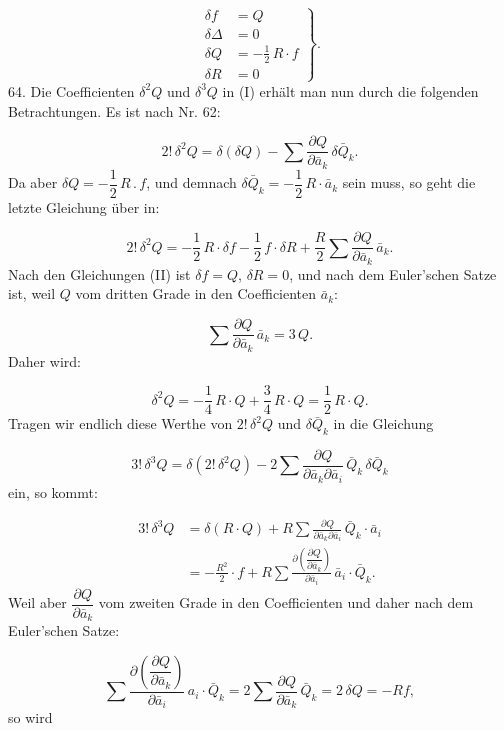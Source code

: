 \documentclass[11pt]{article}
\providecommand{\weberpage}[1]{}
\providecommand{\weq}[2]{\begin{equation}\tag{#1}#2\end{equation}}
\let\Delta\varDelta
\begin{document}
\weq{II}{
\left.\begin{aligned}
\delta f &= Q\\
\delta \Delta &= 0\\
\delta Q &= -\frac{1}{2}\,R\cdot f\\
\delta R &= 0
\end{aligned}\right\} .
}
64. Die Coefficienten $\delta^2 Q$ und $\delta^3 Q$ in (I) erhält man nun durch die folgenden Betrachtungen. Es ist nach Nr. 62:

\[
2!\,\delta^2 Q = \delta(\delta Q) - \sum \frac{\partial Q}{\partial \bar a_k}\,\delta \bar Q_k .
\]
Da aber $\delta Q = -\dfrac{1}{2}\,R\,.\,f$, und demnach $\delta \bar Q_k = -\dfrac{1}{2}\,R \cdot \bar a_k$ sein muss, so geht die letzte Gleichung über in:

\[
2!\,\delta^2 Q = -\frac{1}{2}\,R \cdot \delta f - \frac{1}{2}\,f \cdot \delta R + \frac{R}{2} \sum \frac{\partial Q}{\partial \bar a_k}\, \bar a_k .
\]
Nach den Gleichungen (II) ist $\delta f = Q$, $\delta R = 0$, und nach dem Euler'schen Satze ist, weil $Q$ vom dritten Grade in den Coefficienten $\bar a_k$:

\[
\sum \frac{\partial Q}{\partial \bar a_k}\, \bar a_k = 3\,Q .
\]
Daher wird:

\weq{III}{
\delta^2 Q = -\frac{1}{4}\,R \cdot Q + \frac{3}{4}\,R \cdot Q = \frac{1}{2}\,R \cdot Q .
}
Tragen wir endlich diese Werthe von $2!\,\delta^2 Q$ und $\delta \bar Q_k$ in die Gleichung

\[
3!\,\delta^3 Q = \delta(2!\,\delta^2 Q) - 2 \sum \frac{\partial Q}{\partial \bar a_k \partial \bar a_i}\, \bar Q_k\, \delta \bar Q_k
\]
ein, so kommt:

\[
\begin{aligned}
3!\,\delta^3 Q &= \delta(R \cdot Q) + R \sum \frac{\partial Q}{\partial \bar a_k \partial \bar a_i}\, \bar Q_k \cdot \bar a_i\\[4pt]
&= -\frac{R^2}{2}\cdot f + R \sum \frac{\partial\!\left(\dfrac{\partial Q}{\partial \bar a_k}\right)}{\partial \bar a_i}\, \bar a_i \cdot \bar Q_k .
\end{aligned}
\]
Weil aber $\dfrac{\partial Q}{\partial \bar a_k}$ vom zweiten Grade in den Coefficienten und daher nach dem Euler'schen Satze:


\weberpage{70}
\[
\sum \frac{\partial\!\left(\dfrac{\partial Q}{\partial \bar a_k}\right)}{\partial \bar a_i}\, a_i \cdot \bar Q_k = 2 \sum \frac{\partial Q}{\partial \bar a_k}\, \bar Q_k = 2\,\delta Q = -R f,
\]
so wird
\end{document}
